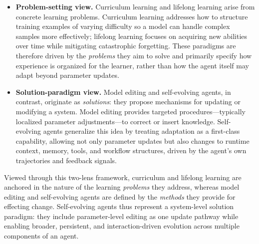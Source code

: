 \begin{itemize}


\item \textbf{Problem-setting view.}
Curriculum learning and lifelong learning arise from concrete learning problems. Curriculum learning addresses how to structure training examples of varying difficulty so a model can handle complex samples more effectively; lifelong learning focuses on acquiring new abilities over time while mitigating catastrophic forgetting. These paradigms are therefore driven by the \emph{problems} they aim to solve and primarily specify how experience is organized for the learner, rather than how the agent itself may adapt beyond parameter updates.

\item \textbf{Solution-paradigm view.}
Model editing and self-evolving agents, in contrast, originate as \emph{solutions}: they propose mechanisms for updating or modifying a system. Model editing provides targeted procedures—typically localized parameter adjustments—to correct or insert knowledge. Self-evolving agents generalize this idea by treating adaptation as a first-class capability, allowing not only parameter updates but also changes to runtime context, memory, tools, and workflow structures, driven by the agent’s own trajectories and feedback signals.

\end{itemize}

Viewed through this two-lens framework, curriculum and lifelong learning are anchored in the nature of the learning \emph{problems} they address, whereas model editing and self-evolving agents are defined by the \emph{methods} they provide for effecting change. Self-evolving agents thus represent a system-level solution paradigm: they include parameter-level editing as one update pathway while enabling broader, persistent, and interaction-driven evolution across multiple components of an agent.




